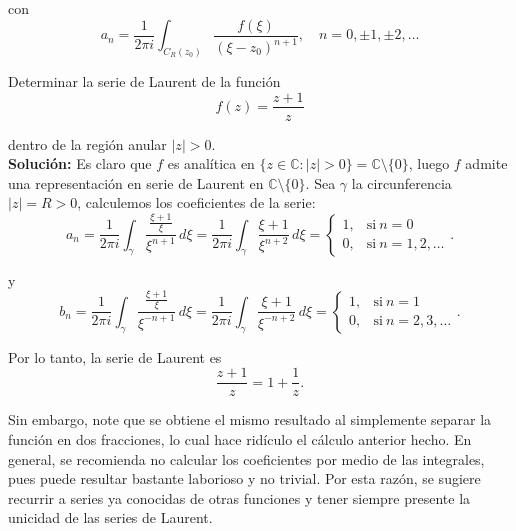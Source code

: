 con
$$a_n = \frac{1}{2\pi i} \int_{C_R(z_0)} \frac{f(\xi)}{(\xi - z_0)^{n+1}}, \quad n = 0,\pm 1, \pm 2, \dots$$

\begin{ejemplo}
Determinar la serie de Laurent de la función
$$f(z) = \frac{z+1}{z}$$

dentro de la región anular $|z| > 0$.
\\

\textbf{Solución:} Es claro que $f$ es analítica en $\{z \in \mathbb{C}: |z| > 0\} = \mathbb{C} \setminus\{0\}$, luego $f$ admite una representación en serie de Laurent en $\mathbb{C} \setminus\{0\}$. Sea $\gamma$ la circunferencia $|z| = R > 0$, calculemos los coeficientes de la serie:
$$a_n = \frac{1}{2\pi i} \int_{\gamma} \frac{\frac{\xi +1}{\xi}}{\xi^{n+1}} \,d\xi = \frac{1}{2\pi i} \int_{\gamma} \frac{\xi +1}{\xi^{n+2}} \,d\xi = \left\{ \begin{array}{cl}
        1, & \mbox{si}~ n = 0  \\
        0, & \mbox{si}~ n = 1,2, \dots
    \end{array} \right. .$$

y
$$ b_n = \frac{1}{2\pi i} \int_{\gamma} \frac{\frac{\xi +1}{\xi}}{\xi^{-n+1}} \,d\xi = \frac{1}{2\pi i} \int_{\gamma} \frac{\xi +1}{\xi^{-n+2}} \,d\xi = \left\{ \begin{array}{cl}
        1, & \mbox{si}~ n = 1  \\
        0, & \mbox{si} ~n = 2,3, \dots
    \end{array} \right. .
$$

Por lo tanto, la serie de Laurent es
$$\frac{z+1}{z} = 1 + \frac{1}{z}.$$

Sin embargo, note que se obtiene el mismo resultado al simplemente separar la función en dos fracciones, lo cual hace ridículo el cálculo anterior hecho. En general, se recomienda no calcular los coeficientes por medio de las integrales, pues puede resultar bastante laborioso y no trivial. Por esta razón, se sugiere recurrir a series ya conocidas de otras funciones y tener siempre presente la unicidad de las series de Laurent.
\end{ejemplo}

